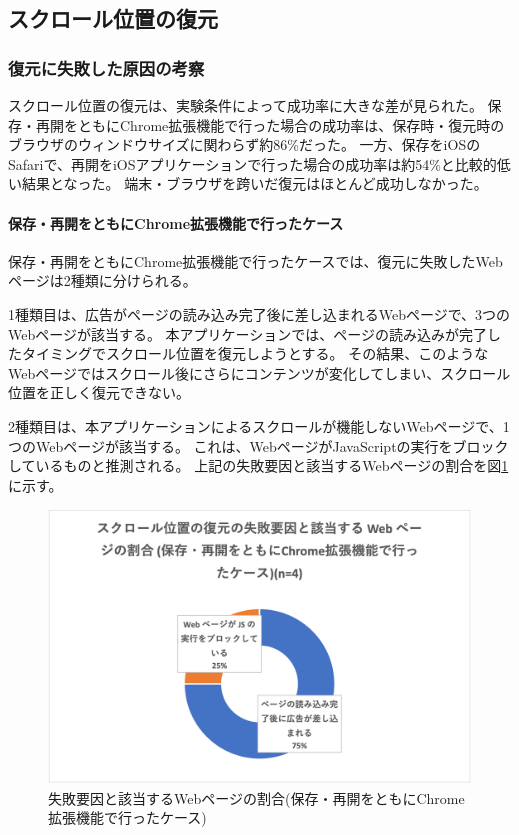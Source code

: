 \subsection{スクロール位置の復元}

\subsubsection{復元に失敗した原因の考察}
スクロール位置の復元は、実験条件によって成功率に大きな差が見られた。
保存・再開をともにChrome拡張機能で行った場合の成功率は、保存時・復元時のブラウザのウィンドウサイズに関わらず約86\%だった。
一方、保存をiOSのSafariで、再開をiOSアプリケーションで行った場合の成功率は約54\%と比較的低い結果となった。
端末・ブラウザを跨いだ復元はほとんど成功しなかった。

\paragraph{保存・再開をともにChrome拡張機能で行ったケース}

保存・再開をともにChrome拡張機能で行ったケースでは、復元に失敗したWebページは2種類に分けられる。

1種類目は、広告がページの読み込み完了後に差し込まれるWebページで、3つのWebページが該当する。
本アプリケーションでは、ページの読み込みが完了したタイミングでスクロール位置を復元しようとする。
その結果、このようなWebページではスクロール後にさらにコンテンツが変化してしまい、スクロール位置を正しく復元できない。

2種類目は、本アプリケーションによるスクロールが機能しないWebページで、1つのWebページが該当する。
これは、WebページがJavaScriptの実行をブロックしているものと推測される。
上記の失敗要因と該当するWebページの割合を図\ref{fig:evl-consideration-scroll-position-cause-ratio-chrome}に示す。

\begin{figure}[htbp]
  \label{fig:evl-consideration-scroll-position-cause-ratio-chrome}
  \begin{center}
    \includegraphics[bb=0 0 452.22222222 293.33333333,width=15cm]{img/060_evaluation/consideration/scroll_position/cause-ratio-chrome.pdf}
  \end{center}
  \caption{失敗要因と該当するWebページの割合(保存・再開をともにChrome拡張機能で行ったケース)}
\end{figure}

